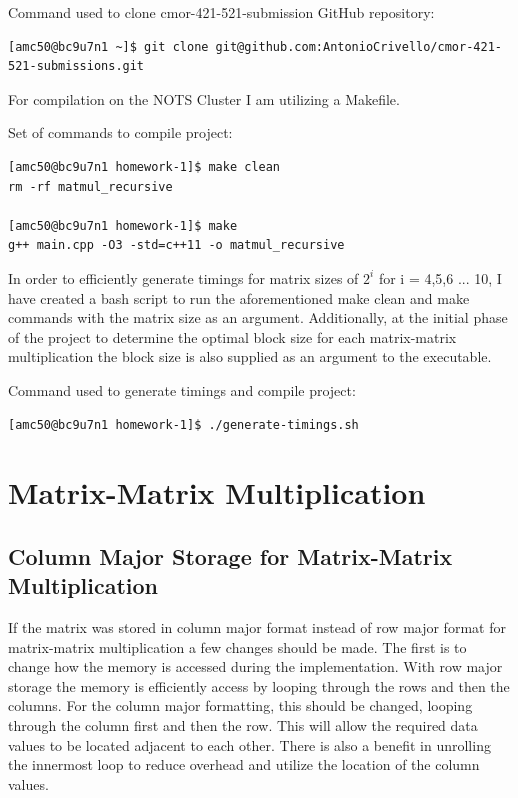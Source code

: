 \documentclass{article}
\begin{document}
\bigskip
\noindent Command used to clone cmor-421-521-submission GitHub repository:
\begin{verbatim}
[amc50@bc9u7n1 ~]$ git clone git@github.com:AntonioCrivello/cmor-421-521-submissions.git    
\end{verbatim}

\bigskip
\noindent For compilation on the NOTS Cluster I am utilizing a Makefile. 

\bigskip
\noindent Set of commands to compile project: 
\begin{verbatim}
[amc50@bc9u7n1 homework-1]$ make clean
rm -rf matmul_recursive 

[amc50@bc9u7n1 homework-1]$ make
g++ main.cpp -O3 -std=c++11 -o matmul_recursive
\end{verbatim}

\bigskip
\noindent In order to efficiently generate timings for matrix sizes of $2^{i}$ for i = 4,5,6 ... 10, I have created a bash script to run the aforementioned make clean and make commands with the matrix size as an argument. Additionally, at the initial phase of the project to determine the optimal block size for each matrix-matrix multiplication the block size is also supplied as an argument to the executable.

\bigskip
\noindent Command used to generate timings and compile project:
\begin{verbatim}
[amc50@bc9u7n1 homework-1]$ ./generate-timings.sh 
\end{verbatim}

\section{Matrix-Matrix Multiplication}

\subsection{Column Major Storage for Matrix-Matrix Multiplication}
If the matrix was stored in column major format instead of row major format for
matrix-matrix multiplication a few changes should be made. The first is to change how the memory is accessed during the implementation. With row major storage the memory is efficiently access by looping through the rows and then the columns. For the column major formatting, this should be changed, looping through the column first and then the row. This will allow the required data values to be located adjacent to each other. There is also a benefit in unrolling the innermost loop to reduce overhead and utilize the
location of the column values.
\end{document}
